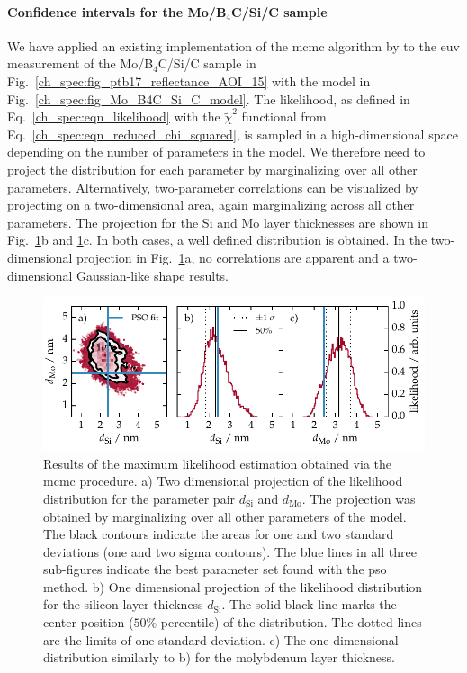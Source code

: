 \paragraph{Confidence intervals for the Mo/B$_4$C/Si/C sample}
We have applied an existing implementation of the \gls{mcmc} algorithm by \textcite{foreman-mackey_emcee:_2013} to the \gls{euv} measurement of the Mo/B$_4$C/Si/C sample in Fig.~\ref{ch_spec:fig_ptb17_reflectance_AOI_15} with the model in Fig.~\ref{ch_spec:fig_Mo_B4C_Si_C_model}. The likelihood, as defined in Eq.~\eqref{ch_spec:eqn_likelihood} with the $\tilde{\chi}^2$ functional from Eq.~\eqref{ch_spec:eqn_reduced_chi_squared}, is sampled in a high-dimensional space depending on the number of parameters in the model. We therefore need to project the distribution for each parameter by marginalizing over all other parameters. Alternatively, two-parameter correlations can be visualized by projecting on a two-dimensional area, again marginalizing across all other parameters. The projection for the Si and Mo layer thicknesses are shown in Fig.~\ref{ch_spec:fig_ptb17_MCMC_d_Mo_vs_d_Si}b and \ref{ch_spec:fig_ptb17_MCMC_d_Mo_vs_d_Si}c. In both cases, a well defined distribution is obtained. In the two-dimensional projection in Fig.~\ref{ch_spec:fig_ptb17_MCMC_d_Mo_vs_d_Si}a, no correlations are apparent and a two-dimensional Gaussian-like shape results.
\begin{figure}[htbp]
\centering
\includegraphics{img/PTB17_MCMC_d_Mo_vs_d_Si}
\caption{Results of the maximum likelihood estimation obtained via the \gls{mcmc} procedure. a) Two dimensional projection of the likelihood distribution for the parameter pair $d_\text{Si}$ and $d_\text{Mo}$. The projection was obtained by marginalizing over all other parameters of the model. The black contours indicate the areas for one and two standard deviations (one and two sigma contours). The blue lines in all three sub-figures indicate the best parameter set found with the \gls{pso} method. b) One dimensional projection of the likelihood distribution for the silicon layer thickness $d_\text{Si}$. The solid black line marks the center position ($50\%$ percentile) of the distribution. The dotted lines are the limits of one standard deviation. c) The one dimensional distribution similarly to b) for the molybdenum layer thickness.}
\label{ch_spec:fig_ptb17_MCMC_d_Mo_vs_d_Si}
\end{figure}
